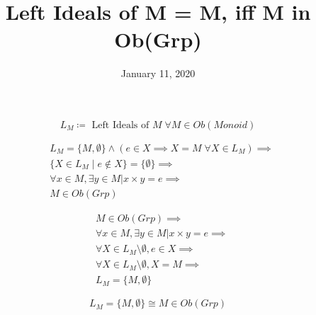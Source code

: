 \documentclass[fleqn, 11pt]{article}
\date{January 11, 2020}
\title{Left Ideals of M = {M, {}} iff M in Ob(Grp)}
\begin{document}
$$ L_M \coloneqq \text{ Left Ideals of } M \;\forall M \in Ob(Monoid) $$

\begin{equation}
\tag{from}
\begin{aligned}
& L_M = \{M, \emptyset\} \land 
  (e \in X \implies X = M \; \forall X \in L_M) \implies \\
& \{X \in L_M \mid e \notin X\} = \{\emptyset\} \implies \\
& \forall x \in M, \exists y \in M | x \times y = e \implies \\
& M \in Ob(Grp)
\end{aligned}
\end{equation}

\begin{equation}
\tag{to}
\begin{aligned}
& M \in Ob(Grp) \implies \\
& \forall x \in M, \exists y \in M | x \times y = e \implies \\
& \forall X \in L_M \setminus \emptyset, e \in X \implies \\
& \forall X \in L_M \setminus \emptyset, X = M \implies \\
& L_M = \{M, \emptyset\}
\end{aligned}
\end{equation}

\hrulefill

$$ L_M = \{M, \emptyset\} \cong M \in Ob(Grp) $$
\end{document}
